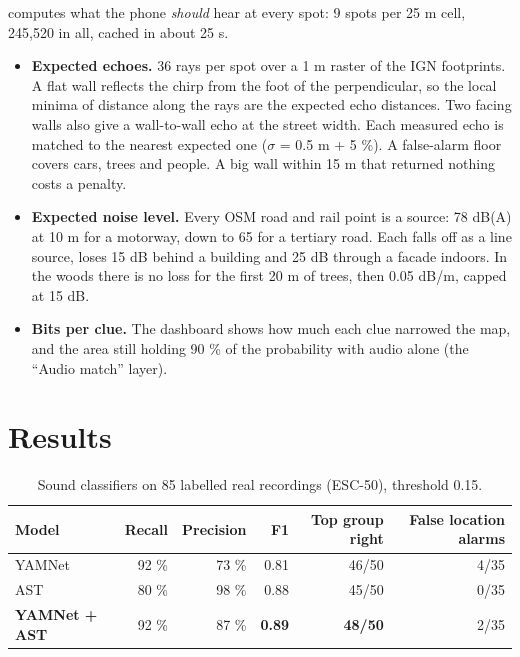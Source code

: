  computes what the phone \emph{should} hear at every spot: 9 spots per 25 m cell, 245,520 in
all, cached in about 25 s.
\begin{itemize}
  \item \textbf{Expected echoes.} 36 rays per spot over a 1 m raster of the IGN footprints. A flat wall reflects
        the chirp from the foot of the perpendicular, so the local minima of distance along the rays are the expected
        echo distances. Two facing walls also give a wall-to-wall echo at the street width. Each measured echo is
        matched to the nearest expected one ($\sigma$ = 0.5 m + 5 \%). A false-alarm floor covers cars, trees and
        people. A big wall within 15 m that returned nothing costs a penalty.
  \item \textbf{Expected noise level.} Every OSM road and rail point is a source: 78 dB(A) at 10 m for a motorway, down
        to 65 for a tertiary road. Each falls off as a line source, loses 15 dB behind a building and 25 dB through a
        facade indoors. In the woods there is no loss for the first 20 m of trees, then 0.05 dB/m, capped at 15 dB.
  \item \textbf{Bits per clue.} The dashboard shows how much each clue narrowed the map, and the area still holding 90 \%
        of the probability with audio alone (the ``Audio match'' layer).
\end{itemize}

\section{Results}

\begin{table}[htbp]\centering\small
\caption{Sound classifiers on 85 labelled real recordings (ESC-50), threshold 0.15.}\label{tab:yamnetast}
\begin{tabular}{lrrrrr}
\toprule
Model & Recall & Precision & F1 & Top group right & False location alarms\\
\midrule
YAMNet & 92 \% & 73 \% & 0.81 & 46/50 & 4/35\\
AST & 80 \% & 98 \% & 0.88 & 45/50 & 0/35\\
\textbf{YAMNet + AST} & 92 \% & 87 \% & \textbf{0.89} & \textbf{48/50} & 2/35\\
\bottomrule
\end{tabular}
\end{table}

